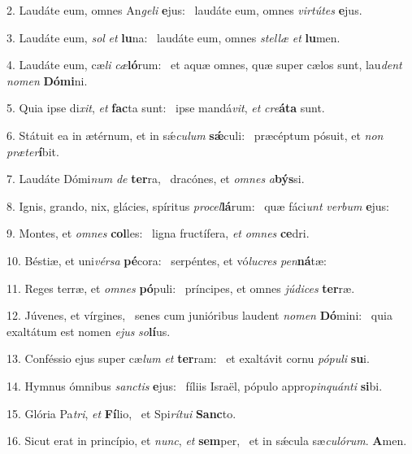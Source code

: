 2. Laudáte eum, omnes An\textit{ge}\textit{li} \textbf{e}jus: \ast\  laudáte eum, omnes \textit{vir}\textit{tú}\textit{tes} \textbf{e}jus.\

3. Laudáte eum, \textit{sol} \textit{et} \textbf{lu}na: \ast\  laudáte eum, omnes \textit{stel}\textit{læ} \textit{et} \textbf{lu}men.\

4. Laudáte eum, cæ\textit{li} \textit{cæ}\textbf{ló}rum: \ast\  et aquæ omnes, quæ super cælos sunt, lau\textit{dent} \textit{no}\textit{men} \textbf{Dó}\textbf{mi}ni.\

5. Quia ipse di\textit{xit}, \textit{et} \textbf{fac}ta sunt: \ast\  ipse mandá\textit{vit}, \textit{et} \textit{cre}\textbf{á}\textbf{ta} sunt.\

6. Státuit ea in ætérnum, et in sǽ\textit{cu}\textit{lum} \textbf{sǽ}culi: \ast\  præcéptum pósuit, et \textit{non} \textit{præ}\textit{ter}\textbf{í}bit.\

7. Laudáte Dómi\textit{num} \textit{de} \textbf{ter}ra, \ast\  dracónes, et \textit{om}\textit{nes} \textit{a}\textbf{býs}si.\

8. Ignis, grando, nix, glácies, spíritus \textit{pro}\textit{cel}\textbf{lá}rum: \ast\  quæ fáci\textit{unt} \textit{ver}\textit{bum} \textbf{e}jus:\

9. Montes, et \textit{om}\textit{nes} \textbf{col}les: \ast\  ligna fructífera, \textit{et} \textit{om}\textit{nes} \textbf{ce}dri.\

10. Béstiæ, et uni\textit{vér}\textit{sa} \textbf{pé}cora: \ast\  serpéntes, et vó\textit{lu}\textit{cres} \textit{pen}\textbf{ná}tæ:\

11. Reges terræ, et \textit{om}\textit{nes} \textbf{pó}puli: \ast\  príncipes, et omnes \textit{jú}\textit{di}\textit{ces} \textbf{ter}ræ.\

12. Júvenes, et vírgines, \dag\  senes cum junióribus laudent \textit{no}\textit{men} \textbf{Dó}mini: \ast\  quia exaltátum est nomen \textit{e}\textit{jus} \textit{so}\textbf{lí}us.\

13. Conféssio ejus super cæ\textit{lum} \textit{et} \textbf{ter}ram: \ast\  et exaltávit cornu \textit{pó}\textit{pu}\textit{li} \textbf{su}i.\

14. Hymnus ómnibus \textit{sanc}\textit{tis} \textbf{e}jus: \ast\  fíliis Israël, pópulo appro\textit{pin}\textit{quán}\textit{ti} \textbf{si}bi.\

15. Glória Pa\textit{tri}, \textit{et} \textbf{Fí}lio, \ast\  et Spi\textit{rí}\textit{tu}\textit{i} \textbf{Sanc}to.\

16. Sicut erat in princípio, et \textit{nunc}, \textit{et} \textbf{sem}per, \ast\  et in sǽcula sæ\textit{cu}\textit{ló}\textit{rum}. \textbf{A}men.\


